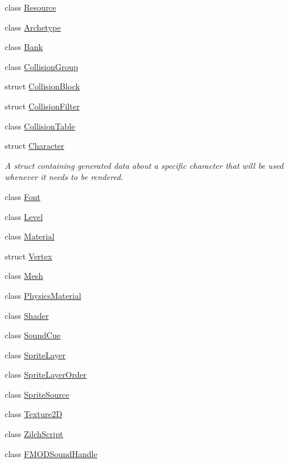 \begin{DoxyCompactItemize}
\item 
class \hyperlink{classDCEngine_1_1Resource}{Resource}
\item 
class \hyperlink{classDCEngine_1_1Archetype}{Archetype}
\item 
class \hyperlink{classDCEngine_1_1Bank}{Bank}
\item 
class \hyperlink{classDCEngine_1_1CollisionGroup}{Collision\-Group}
\item 
struct \hyperlink{structDCEngine_1_1CollisionBlock}{Collision\-Block}
\item 
struct \hyperlink{structDCEngine_1_1CollisionFilter}{Collision\-Filter}
\item 
class \hyperlink{classDCEngine_1_1CollisionTable}{Collision\-Table}
\item 
struct \hyperlink{structDCEngine_1_1Character}{Character}
\begin{DoxyCompactList}\small\item\em A struct containing generated data about a specific character that will be used whenever it needs to be rendered. \end{DoxyCompactList}\item 
class \hyperlink{classDCEngine_1_1Font}{Font}
\item 
class \hyperlink{classDCEngine_1_1Level}{Level}
\item 
class \hyperlink{classDCEngine_1_1Material}{Material}
\item 
struct \hyperlink{structDCEngine_1_1Vertex}{Vertex}
\item 
class \hyperlink{classDCEngine_1_1Mesh}{Mesh}
\item 
class \hyperlink{classDCEngine_1_1PhysicsMaterial}{Physics\-Material}
\item 
class \hyperlink{classDCEngine_1_1Shader}{Shader}
\item 
class \hyperlink{classDCEngine_1_1SoundCue}{Sound\-Cue}
\item 
class \hyperlink{classDCEngine_1_1SpriteLayer}{Sprite\-Layer}
\item 
class \hyperlink{classDCEngine_1_1SpriteLayerOrder}{Sprite\-Layer\-Order}
\item 
class \hyperlink{classDCEngine_1_1SpriteSource}{Sprite\-Source}
\item 
class \hyperlink{classDCEngine_1_1Texture2D}{Texture2\-D}
\item 
class \hyperlink{classDCEngine_1_1ZilchScript}{Zilch\-Script}
\item 
class \hyperlink{classDCEngine_1_1FMODSoundHandle}{F\-M\-O\-D\-Sound\-Handle}

\end{DoxyCompactItemize}
